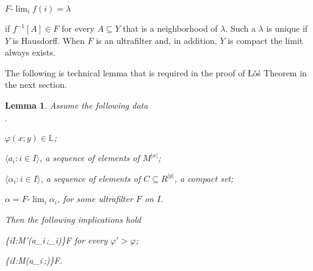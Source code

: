 \documentclass[11pt,oneside]{amsart}
\newcommand{\mylabel}[1]{{#1}\hfill}
\renewenvironment{itemize}
  {\begin{list}{$\cdot$}{%
   \setlength{\parskip}{0mm}
   \setlength{\topsep}{.2\baselineskip}
   \setlength{\rightmargin}{0mm}
   \setlength{\listparindent}{0mm}
   \setlength{\itemindent}{0mm}
   \setlength{\labelwidth}{3ex}
   \setlength{\itemsep}{.2\baselineskip}
   \setlength{\parsep}{.2\baselineskip}
   \setlength{\partopsep}{0mm}
   \setlength{\labelsep}{1ex}
   \setlength{\leftmargin}{\labelwidth+\labelsep}
   \let\makelabel\mylabel}}{%
   \end{list}}
\theoremstyle{plain}
\newtheorem{lemma}[theorem]{Lemma}
\theoremstyle{remark}
\begin{document}
\hfil$\displaystyle F\mbox{-}\lim_{i}f(i)=\lambda$

if $f^{-1}[A]\in F$ for every $A\subseteq Y$ that is a neighborhood of $\lambda$.
Such a $\lambda$ is unique if $Y$ is Hausdorff.
When $F$ is an ultrafilter and, in addition, $Y$ is compact the limit always exists.

The following is technical lemma that is required in the proof of \L\v o\'s Theorem in the next section.

\begin{lemma}\label{lem_HIapprox}
  Assume the following data
  \begin{itemize}
    \item $\varphi(x;y)\in\mathds{L}$;
    \item $\langle a_i:i\in I\rangle$, a sequence of elements of $M^{|x|}$;
    \item $\langle\alpha_i:i\in I\rangle$, a sequence of elements of $C\subseteq R^{|y|}$, a compact set;
    \item $\alpha=F\mbox{-}\lim_i\alpha_i$, for some ultrafilter $F$ on $I$.
  \end{itemize}
  Then the following implications hold

  {\Rightarrow}
  {\big\{i\in I:{\EuScript M}\models\varphi'(a_i\,;\alpha_i)\big\}\in F} for every $\varphi'>\varphi$;

  {\Rightarrow}
  {\big\{i\in I:{\EuScript M}\models\varphi(a_i\,;\alpha)\big\}\in F}.
  
\end{lemma}
\end{document}
